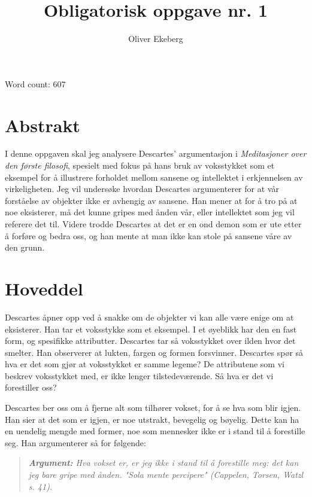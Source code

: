 \documentclass[11pt, a4paper]{article}
\title{Obligatorisk oppgave nr. 1}
\author{Oliver Ekeberg}
\date{}
\newenvironment{argument}{\begin{quote}\itshape\textbf{Argument: }}{\end{quote}}
\begin{document}
\maketitle

Word count: 607


\section{Abstrakt}



I denne oppgaven skal jeg analysere Descartes' argumentasjon i \textit{Meditasjoner over den første filosofi}, spesielt med fokus på hans bruk av voksstykket som et eksempel for å illustrere forholdet mellom sansene og intellektet i erkjennelsen av virkeligheten. Jeg vil undersøke hvordan Descartes argumenterer for at vår forståelse av objekter ikke er avhengig av sansene. Han mener at for å tro på at noe eksisterer, må det kunne gripes med ånden vår, eller intellektet som jeg vil referere det til. Videre trodde Descartes at det er en ond demon som er ute etter å forføre og bedra oss, og han mente at man ikke kan stole på sansene våre av den grunn.


\section{Hoveddel}


Descartes åpner opp ved å snakke om de objekter vi kan alle være enige om at eksisterer. Han tar et voksstykke som et eksempel. I et øyeblikk har den en fast form, og spesifikke attributter. Descartes tar så voksstykket over ilden hvor det smelter. Han observerer at lukten, fargen og formen forsvinner. Descartes spør så hva er det som gjør at voksstykket er samme legeme? De attributene som vi beskrev voksstykket med, er ikke lenger tilstedeværende. Så hva er det vi forestiller oss? 


Descartes ber oss om å fjerne alt som tilhører vokset, for å se hva som blir igjen. Han sier at det som er igjen, er noe utstrakt, bevegelig og bøyelig. Dette kan ha en uendelig mengde med former, noe som mennesker ikke er i stand til å forestille seg. Han argumenterer så for følgende:


\begin{argument}
    Hva vokset er, er jeg ikke i stand til å forestille meg: det kan jeg bare gripe med ånden. "\textit{Sola mente percipere}" (Cappelen, Torsen, Watzl s. 41). 
\end{argument}
\end{document}
